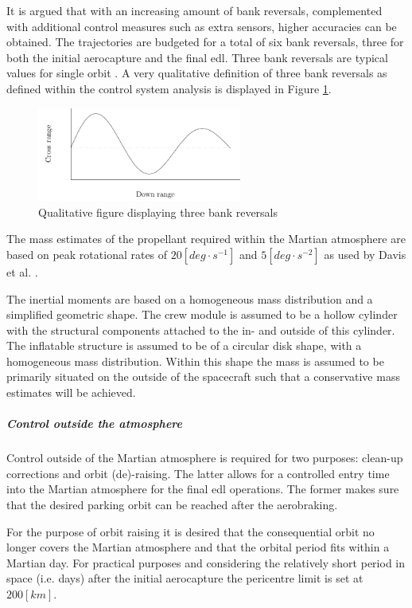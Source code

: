 It is argued that with an increasing amount of bank reversals, complemented with additional control measures such as extra sensors, higher accuracies can be obtained. The trajectories are budgeted for a total of six bank reversals, three for both the initial aerocapture and the final \gls{edl}. Three bank reversals are typical values for single orbit \cite{Lu2007, Cianciolo2010}. A very qualitative definition of three bank reversals as defined within the control system analysis is displayed in Figure \ref{fig:bankdef}.

\begin{figure}[h]
	\centering
	\includegraphics[width=0.6\textwidth]{./Figure/control/Cont.pdf}
	\caption{Qualitative figure displaying three bank reversals}
	\label{fig:bankdef}
\end{figure}

The mass estimates of the propellant required within the Martian atmosphere are based on peak rotational rates of $20 \left[deg\cdot s^{-1}\right]$ and $5\left[deg \cdot s^{-2}\right]$ as used by Davis et al. \cite{Davis2010}.

The inertial moments are based on a homogeneous mass distribution and a simplified geometric shape. The crew module is assumed to be a hollow cylinder with the structural components attached to the in- and outside of this cylinder. The inflatable structure is assumed to be of a circular disk shape, with a homogeneous mass distribution. Within this shape the mass is assumed to be primarily situated on the outside of the spacecraft such that a conservative mass estimates will be achieved.

\subparagraph{Control outside the atmosphere}
Control outside of the Martian atmosphere is required for two purposes: clean-up corrections and orbit (de)-raising. The latter allows for a controlled entry time into the Martian atmosphere for the final \gls{edl} operations. The former makes sure that the desired parking orbit can be reached after the aerobraking.

For the purpose of orbit raising it is desired that the consequential orbit no longer covers the Martian atmosphere and that the orbital period fits within a Martian day. For practical purposes and considering the relatively short period in space (i.e. days) after the initial aerocapture the pericentre limit is set at $200 \left[km\right]$. 

